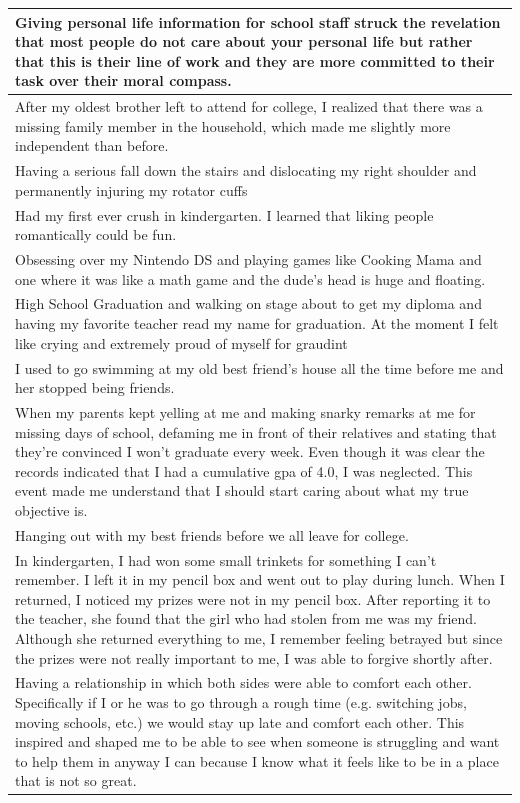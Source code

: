 \documentclass[
  .7em,
  letterpaper,
  DIV=11,
  numbers=noendperiod]{scrartcl}
\begin{document}
\begin{table}
\begin{tabular}{l}
\hline
Giving personal life information for school staff struck the revelation that most people do not care about your personal life but rather that this is their line of work and they are more committed to their task over their moral compass.\\
\hline
After my oldest brother left to attend for college, I realized that there was a missing family member in the household, which made me slightly more independent than before.\\
\hline
Having a serious fall down the stairs and dislocating my right shoulder and permanently injuring my rotator cuffs\\
\hline
Had my first ever crush in kindergarten. I learned that liking people romantically could be fun.\\
\hline
Obsessing over my Nintendo DS and playing games like Cooking Mama and one where it was like a math game and the dude's head is huge and floating.\\
\hline
High School Graduation and walking on stage about to get my diploma and having my favorite teacher read my name for graduation. At the moment I felt like crying and extremely proud of myself for graudint\\
\hline
I used to go swimming at my old best friend's house all the time before me and her stopped being friends.\\
\hline
When my parents kept yelling at me and making snarky remarks at me for missing days of school, defaming me in front of their relatives and stating that they're convinced I won't graduate every week. Even though it was clear the records indicated that I had a cumulative gpa of 4.0, I was neglected. This event made me understand that I should start caring about what my true objective is.\\
\hline
Hanging out with my best friends before we all leave for college.\\
\hline
In kindergarten, I had won some small trinkets for something I can’t remember. I left it in my pencil box and went out to play during lunch. When I returned, I noticed my prizes were not in my pencil box. After reporting it to the teacher, she found that the girl who had stolen from me was my friend. Although she returned everything to me, I remember feeling betrayed but since the prizes were not really important to me, I was able to forgive shortly after.\\
\hline
Having a relationship in which both sides were able to comfort each other. Specifically if I or he was to go through a rough time (e.g. switching jobs, moving schools, etc.) we would stay up late and comfort each other. This inspired and shaped me to be able to see when someone is struggling and want to help them in anyway I can because I know what it feels like to be in a place that is not so great.\\

\end{tabular}
\end{table}
\end{document}
